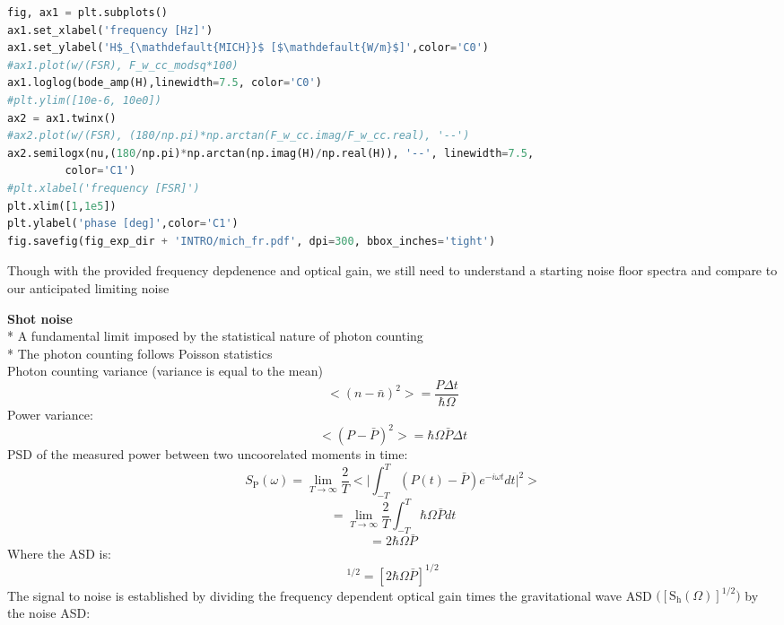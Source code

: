 \begin{spacing}{1} \begin{lstlisting}[frame=single, language=Python]
fig, ax1 = plt.subplots()
ax1.set_xlabel('frequency [Hz]')
ax1.set_ylabel('H$_{\mathdefault{MICH}}$ [$\mathdefault{W/m}$]',color='C0')
#ax1.plot(w/(FSR), F_w_cc_modsq*100)
ax1.loglog(bode_amp(H),linewidth=7.5, color='C0')
#plt.ylim([10e-6, 10e0])
ax2 = ax1.twinx()
#ax2.plot(w/(FSR), (180/np.pi)*np.arctan(F_w_cc.imag/F_w_cc.real), '--')
ax2.semilogx(nu,(180/np.pi)*np.arctan(np.imag(H)/np.real(H)), '--', linewidth=7.5,
	     color='C1')
#plt.xlabel('frequency [FSR]')
plt.xlim([1,1e5])
plt.ylabel('phase [deg]',color='C1')
fig.savefig(fig_exp_dir + 'INTRO/mich_fr.pdf', dpi=300, bbox_inches='tight')
\end{lstlisting} \end{spacing}

Though with the provided frequency depdenence and optical gain, we still
need to understand a starting noise floor spectra and compare to our
anticipated limiting noise 

\textbf{Shot noise} 
\\
* A fundamental limit imposed by the statistical nature of photon counting 
\\
* The photon counting follows Poisson statistics 
\\
\indent    * Photon counting variance (variance is equal to the
mean) 
\begin{equation} < (n-\bar{n})^2 >  = \frac{P \Delta t}{ \hbar \Omega} \end{equation} 
\indent * Power variance:
\begin{equation} < (P - \bar{P})^2 >  = \hbar \Omega  \bar{P} \Delta t \end{equation} 
\indent * PSD of the measured power between two uncoorelated moments in time:
\begin{equation} S_\mathrm{P} (\omega) = \lim_{T \to \infty} \frac{2}{T} \Big< \big| \int_{-T}^{T} (P(t) - \bar{P}) e^{-i\omega t} dt \big|^2 \Big> \end{equation}
\begin{equation} =  \lim_{T \to \infty} \frac{2}{T} \int_{-T}^{T} \hbar \Omega \bar{P} dt  \end{equation}
\begin{equation} = 2 \hbar \Omega \bar{P} \end{equation} 
\indent * Where the ASD is:
\begin{equation} [S_P (\omega)]^{1/2} = [2 \hbar \Omega \bar{P}]^{1/2}\end{equation}The signal to
noise is established by dividing the frequency dependent optical gain
times the gravitational wave ASD
\(\big( [\mathrm{S}_{\mathrm{h}}(\Omega)]^{1/2} \big)\) by the noise
ASD:

